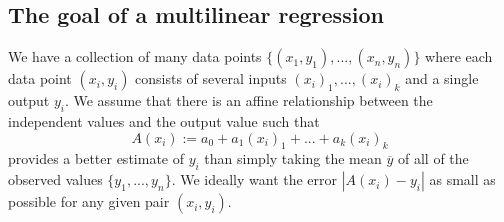 \subsection{The goal of a multilinear regression}

We have a collection of many data points $\{(x_1, y_1),...,(x_n, y_n)\}$ where each data point $(x_i, y_i)$ consists of several inputs $(x_i)_1,...,(x_i)_k$ and a single output $y_i$. We assume that there is an affine relationship between the independent values and the output value such that
$$A(x_i):=a_0+a_1(x_i)_1+...+a_k(x_i)_k$$
provides a better estimate of $y_i$ than simply taking the mean $\overline{y}$ of all of the observed values $\{y_1,...,y_n\}$. We ideally want the error $\left|A(x_i) - y_i\right|$ as small as possible for any given pair $(x_i, y_i)$.
